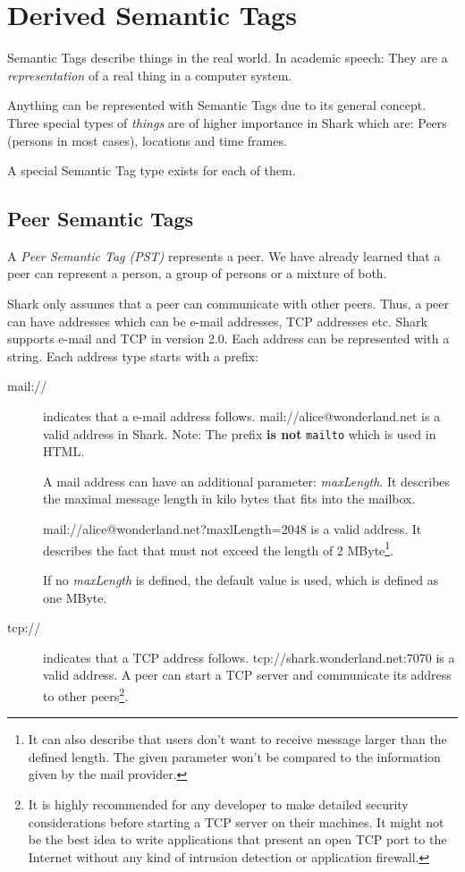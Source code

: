 \chapter{Derived Semantic Tags}
Semantic Tags describe things in the real world. In academic speech: They are a {\it representation} of a real thing in a computer system.

Anything can be represented with Semantic Tags due to its general concept. Three special types of {\it things} are of higher importance in Shark which are: Peers (persons in most cases), locations and time frames.

A special Semantic Tag type exists for each of them.

\section{Peer Semantic Tags}
A {\it Peer Semantic Tag (PST)} represents a peer. We have already learned that a peer can represent a person, a group of persons or a mixture of both.

Shark only assumes that a peer can communicate with other peers. Thus, a peer can have addresses which can be e-mail addresses, TCP addresses etc. Shark supports e-mail and TCP in version 2.0. Each address can be represented with a string. Each address type starts with a prefix:

\begin{description}
    \item[mail://] indicates that a e-mail address follows. mail://alice@wonderland.net is a valid address in Shark. Note: The prefix {\bf is not} {\tt mailto} which is used in HTML. 

A mail address can have an additional parameter: {\it maxLength}. It describes the maximal message length in kilo bytes that fits into the mailbox. 

mail://alice@wonderland.net?maxlLength=2048 is a valid address. It describes the fact that must not exceed the length of 2 MByte\footnote{It can also describe that users don't want to receive message larger than the defined length. The given parameter won't be compared to the information given by the mail provider.}.

If no {\it maxLength} is defined, the default value is used, which is defined as one MByte.

    \item[tcp://] indicates that a TCP address follows.
tcp://shark.wonderland.net:7070 is a valid address. A peer can start a TCP server and communicate its address to other peers\footnote{It is highly recommended for any developer to make detailed security considerations before starting a TCP server on their machines. It might not be the best idea to write applications that present an open TCP port to the Internet without any kind of intrusion detection or application firewall.}.

\end{description}

